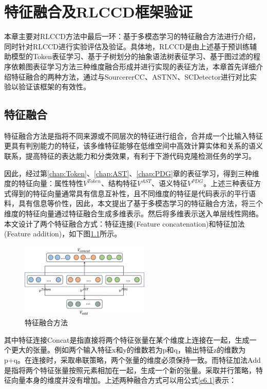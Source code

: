\chapter{特征融合及RLCCD框架验证}
\label{chap:fusion}
本章主要对RLCCD方法中最后一环：基于多模态学习的特征融合方法进行介绍，同时针对RLCCD进行实验评估及验证。具体地，RLCCD是由上述基于预训练辅助模型的Token表征学习、基于子树划分的抽象语法树表征学习、基于图过滤的程序依赖图表征学习方法三种维度融合形成并进行实现的表征方法，本章首先详细介绍特征融合的两种方法，通过与SourcererCC、ASTNN、SCDetector进行对比实验以验证该框架的有效性。
\section{特征融合}
特征融合方法是指将不同来源或不同层次的特征进行组合，合并成一个比输入特征更具有判别能力的特征，该多维特征能够在低维空间中高效计算实体和关系的语义联系，提高特征的表达能力和分类效果，有利于下游代码克隆检测任务的学习。

因此，经过第\ref{chap:Token}、\ref{chap:AST}、\ref{chap:PDG}章的表征学习，得到三种维度的特征向量：属性特性$V^{Token}$、结构特征$V^{AST}$、语义特征$V^{PDG}$。上述三种表征方式得到的特征向量通常具有信息互补性，且不同维度的特征是代码表示的平行语料，具有信息等价性\cite{Multimodal}，因此，本文提出了基于多模态学习的特征融合方法，将三个维度的特征向量通过特征融合生成多维表示。然后将多维表示送入单层线性网络。本文设计了两个特征融合方式：特征连接(Feature concatenation)和特征加法(Feature addition)，如下图\ref{fig:concat_add}所示。

\begin{figure}[H]
  \centering
  \includegraphics[width=0.55\textwidth]{figures/concat_add.png}
  \caption{特征融合方法}\label{fig:concat_add}
\end{figure}

其中特征连接Concat是指直接将两个特征张量在某个维度上连接在一起，生成一个更大的张量。例如两个输入特征x和y的维数若为p和q，输出特征z的维数为p+q。在连接时，采取串联策略，两个张量的维度必须保持一致。而特征加法Add是指将两个特征张量按照元素相加在一起，生成一个新的张量。采取并行策略，特征向量本身的维度并没有增加。上述两种融合方式可以用公式\ref{e6.1}表示：

